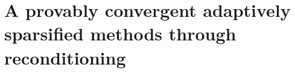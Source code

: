 \chapter[Reconditioned sparsification]{A provably convergent adaptively sparsified methods through reconditioning}\label{ch:spy}
\localtableofcontents*
\newpage





